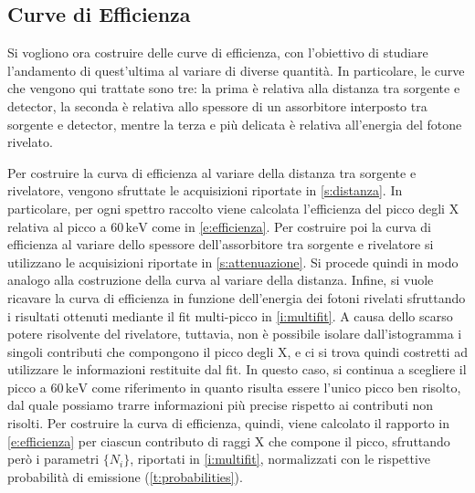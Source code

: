 \documentclass[twocolumn,10pt]{asme2ej}
\begin{document}
\subsection{Curve di Efficienza}

Si vogliono ora costruire delle curve di efficienza, con l'obiettivo di studiare l'andamento di quest'ultima al variare
di diverse quantità. In particolare, le curve che vengono qui trattate sono tre: la prima è relativa alla distanza tra
sorgente e detector, la seconda è relativa allo spessore di un assorbitore interposto tra sorgente e detector, mentre la
terza e più delicata è relativa all'energia del fotone rivelato. 

Per costruire la curva di efficienza al variare della distanza tra sorgente e rivelatore, vengono sfruttate le
acquisizioni riportate in \autoref{s:distanza}. In particolare, per ogni spettro raccolto viene calcolata l'efficienza
del picco degli X relativa al picco a $60\,\si{\kilo\electronvolt}$ come in \autoref{e:efficienza}. Per costruire poi la
curva di efficienza al variare dello spessore dell'assorbitore tra sorgente e rivelatore si utilizzano le acquisizioni
riportate in \autoref{s:attenuazione}. Si procede quindi in modo analogo alla costruzione della curva al variare della
distanza. Infine, si vuole ricavare la curva di efficienza in funzione dell'energia dei fotoni rivelati sfruttando  i
risultati ottenuti mediante il fit multi-picco in \autoref{i:multifit}. A causa dello scarso potere risolvente del
rivelatore, tuttavia, non è possibile isolare dall'istogramma i singoli contributi che compongono il picco degli X, e ci
si trova quindi costretti ad utilizzare le informazioni restituite dal fit. In questo caso, si continua a scegliere il
picco a $60\,\si{\kilo\electronvolt}$ come riferimento in quanto risulta essere l'unico picco ben risolto, dal quale
possiamo trarre informazioni più precise rispetto ai contributi non risolti. Per costruire la curva di efficienza,
quindi, viene calcolato il rapporto in \autoref{e:efficienza} per ciascun contributo di raggi X che compone il picco,
sfruttando però i parametri $\{N_i\}$, riportati in \autoref{i:multifit}, normalizzati con le rispettive probabilità di
emissione (\autoref{t:probabilities}). 
\end{document}
